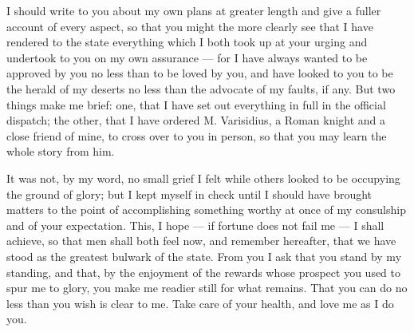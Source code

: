 

 I should write to you about my own plans at greater length and give a fuller account of every aspect, so that you might the more clearly see that I have rendered to the state everything which I both took up at your urging and undertook to you on my own assurance --- for I have always wanted to be approved by you no less than to be loved by you, and have looked to you to be the herald of my deserts no less than the advocate of my faults, if any. But two things make me brief: one, that I have set out everything in full in the official dispatch; the other, that I have ordered M. Varisidius, a Roman knight and a close friend of mine, to cross over to you in person, so that you may learn the whole story from him.

 It was not, by my word, no small grief I felt while others looked to be occupying the ground of glory; but I kept myself in check until I should have brought matters to the point of accomplishing something worthy at once of my consulship and of your expectation. This, I hope --- if fortune does not fail me --- I shall achieve, so that men shall both feel now, and remember hereafter, that we have stood as the greatest bulwark of the state. From you I ask that you stand by my standing, and that, by the enjoyment of the rewards whose prospect you used to spur me to glory, you make me readier still for what remains. That you can do no less than you wish is clear to me. Take care of your health, and love me as I do you.
